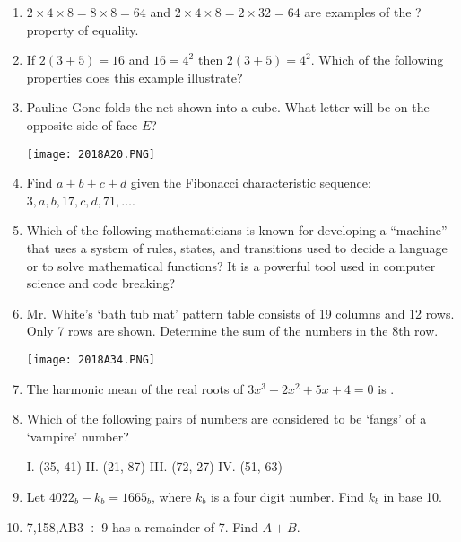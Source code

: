 \documentclass[../uilmath.tex]{subfiles}
\begin{document}
\begin{enumerate}[label=\bfseries\arabic*.]
    \item %
    $2\times 4\times 8 = 8\times 8 = 64$ and $2\times 4\times 8 = 2\times 32 = 64$ are examples of the ? property of equality.

    \item %
    If $2(3+5)=16$ and $16=4^2$ then $2(3+5)=4^2$. Which of the following properties does this example illustrate?

    \item %
    Pauline Gone folds the net shown into a cube. What letter will be on the opposite side of face $E$?
    \begin{center}
        \texttt{[image: 2018A20.PNG]}
    \end{center}

    \item %
    Find $a+b+c+d$ given the Fibonacci characteristic sequence: $3,a,b,17,c,d,71,\dots$.

    \item %
    Which of the following mathematicians is known for developing a ``machine'' that uses a system of rules, states, and transitions 
    used to decide a language or to solve mathematical functions? It is a powerful tool used in computer science and code breaking?

    \item %
    Mr. White's `bath tub mat' pattern table consists of 19 columns and 12 rows. Only 7 rows are shown. Determine the sum of the numbers in the 8th row.
    \begin{center}
        \texttt{[image: 2018A34.PNG]}
    \end{center}

    \item %
    The harmonic mean of the real roots of $3x^3+2x^2+5x+4=0$ is \blank .

    \item %
    Which of the following pairs of numbers are considered to be `fangs' of a `vampire' number?

    I. (35, 41) \qquad II. (21, 87) \qquad III. (72, 27) \qquad IV. (51, 63)

    \item %
    Let $4022_b - k_b = 1665_b$, where $k_b$ is a four digit number. Find $k_b$ in base 10.

    \item %
    7,158,AB3 $\div$ 9 has a remainder of 7. Find $A+B$.


\end{enumerate}
\end{document}
